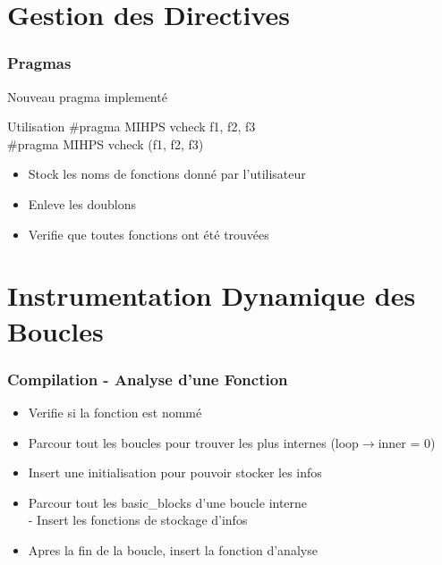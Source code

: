 \documentclass{beamer}
\begin{document}
\section{Gestion des Directives}

\begin{frame}
  \frametitle{Pragmas}
  Nouveau pragma implement\'e
  \begin{block}
    {Utilisation}
    \#pragma MIHPS vcheck \space f1, f2, f3\\
    \#pragma MIHPS vcheck (f1, f2, f3)
  \end{block}
  \begin{itemize}
    \item Stock les noms de fonctions donn\'e par l'utilisateur
    \item Enleve les doublons
    \item Verifie que toutes fonctions ont \'et\'e trouv\'ees
  \end{itemize}
\end{frame}




\section{Instrumentation Dynamique des Boucles}

\begin{frame}
  \frametitle{Compilation - Analyse d'une Fonction}
  \begin{itemize}
    \item Verifie si la fonction est nomm\'e
    \item Parcour tout les boucles pour trouver les plus internes (loop$\rightarrow$inner = 0)
    \item Insert une initialisation pour pouvoir stocker les infos
    \item Parcour tout les basic\_blocks d'une boucle interne\\
      - Insert les fonctions de stockage d'infos
    \item Apres la fin de la boucle, insert la fonction d'analyse
  \end{itemize}
\end{frame}
\end{document}

